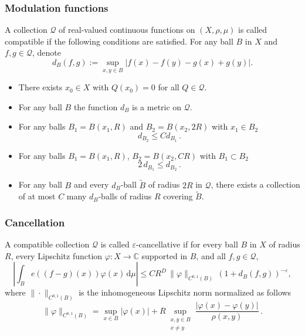 \documentclass[12pt,reqno,a4paper,dvipsnames]{amsart}
\theoremstyle{plain}
\theoremstyle{definition}
\numberwithin{theorem}{section}
\numberwithin{equation}{section}
\newcommand{\AD}{D}
\begin{document}
\subsubsection{Modulation functions}
A collection $\mathcal{Q}$ of real-valued continuous functions on $(X,\rho,\mu)$ is called compatible if the following conditions are satisfied. For any ball $B$ in $X$ and $f, g \in \mathcal{Q}$, denote 
\begin{equation}\label{e:osccontrol}
    d_B(f,g) := \sup_{x,y\in B} |f(x)-f(y)-g(x)+g(y)|. 
\end{equation}
\begin{itemize}
    \item[(1)] There exists $x_0 \in X$ with $Q(x_0) = 0$ for all $Q \in \mathcal{Q}$.
    \item[(2)] For any ball $B$ the function $d_B$ is a metric on $\mathcal{Q}$. 
    \item[(3)] For any balls $B_1 = B(x_1,R)$ and $B_2 = B(x_2,2R)$ with $x_1 \in B_2$ 
    \begin{equation}\label{e:firstdb}
        d_{B_2} \le C d_{B_1}\,.
    \end{equation}
    \item[(4)] For any balls $B_1 = B(x_1,R)$, $B_2 = B(x_2, C R)$ with $B_1 \subset B_2$ 
    \begin{equation}\label{e:seconddb}
        2\, d_{B_1} \le d_{B_2}\,.
    \end{equation}
    \item[(5)] For any ball $B$ and every $d_B$-ball $\widetilde{B}$ of radius $2R$ in $\mathcal{Q}$, there exists a collection of at most $C$ many $d_B$-balls of radius $R$ covering $\widetilde{B}$.
\end{itemize}

\subsubsection{Cancellation} A compatible collection $\mathcal{Q}$ is called $\varepsilon$-cancellative if for every ball $B$ in $X$ of radius $R$, every Lipschitz function $\varphi \colon X \to \mathbb{C}$ supported in $B$, and all $f,g \in \mathcal{Q}$,
\begin{equation}\label{e:vdc cond}
    \left|\int_B e((f-g)(x))\varphi(x)\, \mathrm{d}\mu\right|
    \le C R^{\AD}\, \|\varphi\|_{C^{0,1}(B)}\, (1 + d_B(f,g))^{-\varepsilon},
\end{equation}
where $\|\cdot\|_{C^{0,1}(B)}$ is the inhomogeneous Lipschitz norm normalized as follows 
\[
    \|\varphi\|_{C^{0,1}(B)} =  \sup_{x \in B} |\varphi(x)| +   R \sup_{\substack{x,y \in B \\ x \neq y}} \frac{|\varphi(x) - \varphi(y)|}{\rho(x,y)}\,.
\]
\end{document}
